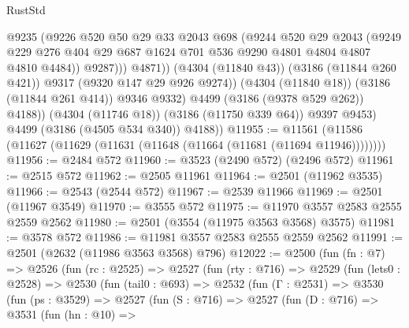 \begin{lexlean}{RustStd}
\begin{coremodule}
{\begin{coremodule}
{{{{{{{{{{{{{{{{{{{{                          @9235
                          (@9226
                            @520
                            @50
                            @29
                            @33
                            @2043
                            @698
                            (@9244
                              @520
                              @29
                              @2043
                              (@9249
                                @229
                                @276
                                @404
                                @29
                                @687
                                @1624
                                @701
                                @536
                                @9290
                                @4801
                                @4804
                                @4807
                                @4810
                                @4484))
                            @9287)))
                      @4871))
                  (@4304 (@11840 @43))
                  (@3186 (@11844 @260 @421))
                  @9317
                  (@9320 @147 @29 @926 @9274))
                (@4304 (@11840 @18))
                (@3186 (@11844 @261 @414))
                @9346
                @9332)
              @4499
              (@3186 (@9378 @529 @262))
              @4188))
          (@4304 (@11746 @18))
          (@3186 (@11750 @339 @64))
          @9397
          @9453)
        @4499
        (@3186 (@4505 @534 @340))
        @4188))
@11955 := @11561 (@11586 (@11627 (@11629 (@11631 (@11648 (@11664 (@11681 (@11694 @11946))))))))
@11956 := @2484 @572
@11960 := @3523 (@2490 @572) (@2496 @572)
@11961 := @2515 @572
@11962 := @2505 @11961
@11964 := @2501 (@11962 @3535)
@11966 := @2543 (@2544 @572)
@11967 := @2539 @11966
@11969 := @2501 (@11967 @3549)
@11970 := @3555 @572
@11975 := @11970 @3557 @2583 @2555 @2559 @2562
@11980 := @2501 (@3554 (@11975 @3563 @3568) @3575)
@11981 := @3578 @572
@11986 := @11981 @3557 @2583 @2555 @2559 @2562
@11991 := @2501 (@2632 (@11986 @3563 @3568) @796)
@12022 := @2500
    (fun (fn : @7) =>
    @2526
      (fun (rc : @2525) =>
      @2527
        (fun (rty : @716) =>
        @2529
          (fun (lets0 : @2528) =>
          @2530
            (fun (tail0 : @693) =>
            @2532
              (fun (Γ : @2531) =>
              @3530
                (fun (ps : @3529) =>
                @2527
                  (fun (S : @716) =>
                  @2527
                    (fun (D : @716) =>
                    @3531
                      (fun (hn : @10) =>
}}}}}}}}}}}}}}}}}}}}
\end{coremodule}}
\end{coremodule}
\end{lexlean}
